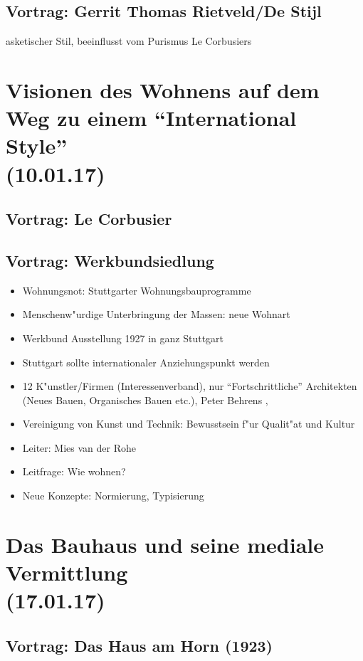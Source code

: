 \documentclass[a5paper]{scrartcl}
\begin{document}
\subsection{Vortrag: Gerrit Thomas Rietveld/De Stijl}

asketischer Stil, beeinflusst vom Purismus Le Corbusiers

\section{Visionen des Wohnens auf dem Weg zu einem “International Style”\\(10.01.17)}

\subsection{Vortrag: Le Corbusier}

\subsection{Vortrag: Werkbundsiedlung}

\begin{itemize}
  \item Wohnungsnot: Stuttgarter Wohnungsbauprogramme
  \item Menschenw"urdige Unterbringung der Massen: neue Wohnart
  \item Werkbund Ausstellung 1927 in ganz Stuttgart
  \item Stuttgart sollte internationaler Anziehungspunkt werden
  \item 12 K"unstler/Firmen (Interessenverband), nur "`Fortschrittliche"' Architekten (Neues Bauen, Organisches Bauen etc.), Peter Behrens , 
  \item Vereinigung von Kunst und Technik: Bewusstsein f"ur Qualit"at und Kultur
  \item Leiter: Mies van der Rohe
  \item Leitfrage: Wie wohnen?
  \item Neue Konzepte: Normierung, Typisierung
\end{itemize}



\section{Das Bauhaus und seine mediale Vermittlung\\(17.01.17)}

\subsection{Vortrag: Das Haus am Horn (1923)}
\end{document}
